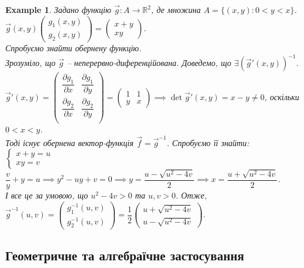 \documentclass[a4paper, 10pt]{article}
\def\departial#1#2{\dfrac{\partial {#1}}{\partial {#2}}}
\theoremstyle{theoremdd}
\theoremstyle{theoremdd}
\theoremstyle{theoremdd}
\theoremstyle{theoremdd}
\theoremstyle{theoremdd}
\newtheorem{example}[theorem]{Example}
\theoremstyle{theoremdd}
\theoremstyle{theoremdd}
\theoremstyle{theoremdd}
\theoremstyle{theoremdd}
\begin{document}
\begin{example}
Задано функцію $\vec{g}\colon A \to \mathbb{R}^2$, де множина $A = \{(x,y): 0 < y < x\}$.\\
$\vec{g}(x,y) \begin{pmatrix}
g_1(x,y) \\ g_2(x,y)
\end{pmatrix} = \begin{pmatrix}
x+y \\ xy
\end{pmatrix}$.\\
Спробуємо знайти обернену функцію.\\
Зрозуміло, що $\vec{g}$ -- неперервно-диференційована. Доведемо, що $\exists (\vec{g}'(x,y))^{-1}$.\\
$\vec{g}'(x,y) = \begin{pmatrix}
\departial{g_1}{x} & \departial{g_1}{y} \\
\departial{g_2}{x} & \departial{g_2}{y} \\
\end{pmatrix} = \begin{pmatrix}
1 & 1 \\
y & x
\end{pmatrix} \implies \det \vec{g}'(x,y) = x-y \neq 0$, оскільки $0<x<y$.\\
Тоді існує обернена вектор-функція $\vec{f} = \vec{g}^{-1}$. Спробуємо її знайти:\\
$\begin{cases}
x+y = u \\
xy = v
\end{cases}$\\
$\dfrac{v}{y}+y = u \implies y^2 -uy + v = 0 \implies y = \dfrac{u-\sqrt{u^2-4v}}{2} \implies x = \dfrac{u+\sqrt{u^2-4v}}{2}$.\\
І все це за умовою, що $u^2-4v>0$ та $u,v>0$. Отже, $\vec{g}^{-1}(u,v) = \begin{pmatrix}
g_1^{-1}(u,v) \\ g_2^{-1}(u,v)
\end{pmatrix} = \dfrac{1}{2} \begin{pmatrix}
u + \sqrt{u^2-4v} \\ u-\sqrt{u^2-4v}
\end{pmatrix}$.
\end{example}

\subsection{Геометричне та алгебраїчне застосування}
\end{document}
